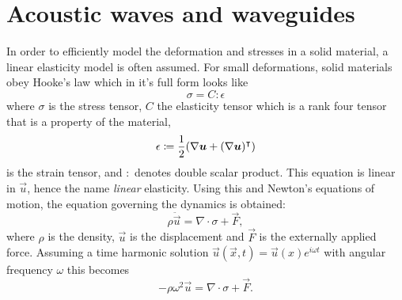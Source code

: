 \chapter{Acoustic waves and waveguides}

In order to efficiently model the deformation and stresses in a solid material,
a linear elasticity model is often assumed.
For small deformations, solid materials obey Hooke's law which in it's full form
looks like
\begin{equation}\label{eq:stress}
	\sigma = C : \epsilon
\end{equation}
where $\sigma$ is the stress tensor, $C$ the elasticity tensor which is a
rank four tensor that is a property of the material,
\begin{equation}\label{eq:strain}
	\epsilon \coloneqq \frac12(\nabla \bm u + (\nabla \bm u)^\intercal)
\end{equation}
is the strain tensor, and $:$ denotes double scalar product.
This equation is linear in $\vec u$, hence the name \emph{linear} elasticity.
Using this and Newton's equations of motion, the equation governing the dynamics
is obtained:
\begin{equation}\label{eq:lin_el}
	\rho \ddot{\vec{u}} = \nabla \cdot \sigma + \vec F,
\end{equation}
where $\rho$ is the density, $\vec{u}$ is the displacement and $\vec F$ is the
externally applied force.
Assuming a time harmonic solution
$\vec u(\vec x, t) = \vec u(x) e^{i \omega t}$
with angular frequency $\omega$ this becomes
\begin{equation}\label{eq:lin_el2}
	-\rho \omega^2 \vec{u} = \nabla \cdot \sigma + \vec F.
\end{equation}

